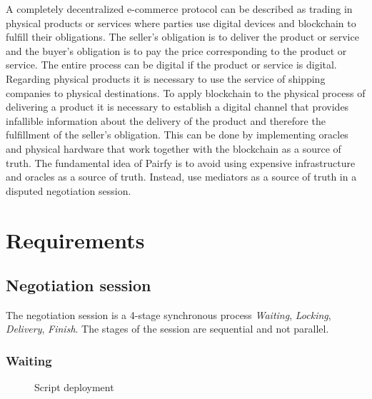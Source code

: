 \documentclass[12pt]{article}
\begin{document}
A completely decentralized e-commerce protocol can be described as trading in physical products or services where parties use digital devices and blockchain to fulfill their obligations.
The seller's obligation is to deliver the product or service and the buyer's obligation is to pay the price corresponding to the product or service. 
The entire process can be digital if the product or service is digital.
Regarding physical products it is necessary to use the service of shipping companies to physical destinations.
To apply blockchain to the physical process of delivering a product it is necessary to establish a digital channel that provides infallible information about the delivery of the product and therefore the fulfillment of the seller's obligation. This can be done by implementing oracles and physical hardware that work together with the blockchain as a source of truth. The fundamental idea of Pairfy is to avoid using expensive infrastructure and oracles as a source of truth. Instead, use mediators as a source of truth in a disputed negotiation session.

\section{ Requirements }

\subsection { Negotiation session }

The negotiation session is a 4-stage synchronous process \emph{Waiting}, \emph{Locking}, \emph{Delivery}, \emph{Finish}. The stages of the session are sequential and not parallel.

\subsubsection { Waiting }

\begin{figure}[ht]
  \centering
  
  \caption{Script deployment}
  \label{fig:mi_imagen}
\end{figure}
\end{document}

